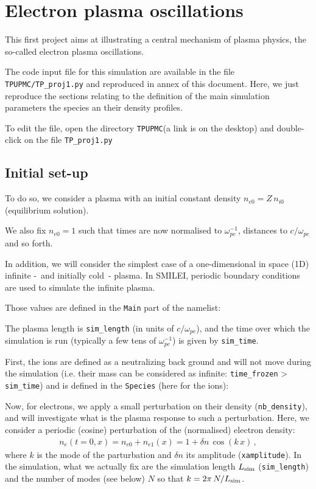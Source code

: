 \documentclass[11pt,a4paper]{article}
\newcommand{\class}[1] {{\color{magenta}\texttt{#1}}}
\newcommand{\code}[1] {{\color{classcolour}\texttt{#1}}}
\newcommand{\param}[1] {{\color{paramcolour}\texttt{#1}}}
\newcommand{\addsubsection}[1] {
\subsection*{#1}
\addcontentsline{toc}{subsection}{#1}}
\begin{document}
\newpage
\section{Electron plasma oscillations}\label{proj1}

This first project aims at illustrating a central mechanism of plasma physics, the so-called electron plasma oscillations.

The code input file for this simulation are available in the file \texttt{TPUPMC/TP\_proj1.py} and reproduced in annex of this document.
Here, we just reproduce the sections relating to the definition of the main simulation parameters the species an their density profiles.

To edit the file, open the directory  \texttt{TPUPMC}(a link is on the desktop)  and double-click on the file  \texttt{TP\_proj1.py} 

\addsubsection{Initial set-up}
To do so, we consider a plasma with an initial  constant density $n_{e0} = Z\,n_{i0}$ (equilibrium solution).

We also fix $n_{e0}=1$ such that times are now normalised to $\omega_{pe}^{-1}$, distances to $c/\omega_{pe}$ and so forth.

In addition, we will consider the simplest case of a one-dimensional in space (1D) infinite -~and initially cold~- plasma.
In SMILEI, periodic boundary conditions are used to simulate the infinite plasma.

Those values are defined in the \class{Main} part of the namelist:


The plasma length is \code{sim\_length}  (in units of $c/\omega_{pe}$), and the time over which the simulation is run (typically a few tens of $\omega_{pe}^{-1}$) is given by \code{sim\_time}. 

First, the ions are defined as a neutralizing back ground and will not move during the simulation (i.e. their mass can be considered as infinite: \code{time\_frozen} > \code{sim\_time}) and is defined in the \class{Species} (here for the ions):


Now, for electrons, we apply a small perturbation on their density (\code{nb\_density}), and will investigate what is the plasma response to such a perturbation.
Here, we consider a periodic (cosine) perturbation of the (normalised) electron density:
\begin{eqnarray}\label{eq_pert}
n_e(t=0,x) = n_{e0}+n_{e1}(x) = 1 + \delta n\,\cos(k\,x)\,,
\end{eqnarray}
where $k$ is the mode of the parturbation and $\delta n$ its amplitude (\param{xamplitude}). 
In the simulation, what we actually fix are the simulation length $L_{\rm sim}$ (\code{sim\_length}) and the number of modes (see below) $N$ so that $k=2\pi\,N/L_{\rm sim}$.
\end{document}
